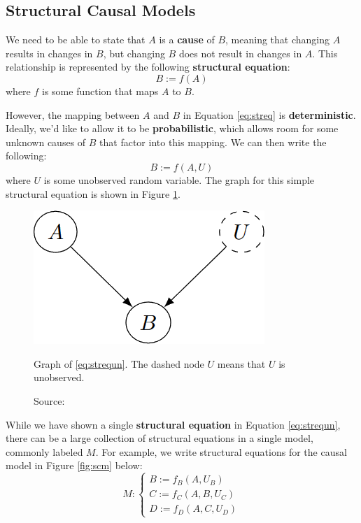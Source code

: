 \subsection{Structural Causal Models}
\label{sec:scm}

We need to be able to state that $A$ is a \textbf{cause} of $B$,
meaning that changing $A$ results in changes in $B$, but changing
$B$ does not result in changes in $A$.
This relationship is represented by the following
\textbf{structural equation}:
\begin{equation}
B := f(A) \label{eq:streq}
\end{equation}
where \( f \) is some function that maps $A$ to $B$.

However, the mapping between $A$ and $B$ in Equation \ref{eq:streq}
is \textbf{deterministic}. Ideally, we'd like to allow it to be
\textbf{probabilistic}, which allows room for some unknown
causes of $B$ that factor into this mapping.
We can then write the following:
\begin{equation}
B := f(A, U) \label{eq:strequn}
\end{equation}
where \( U \) is some unobserved random variable.
The graph for this simple structural equation is shown in Figure \ref{fig:struct_eq}.

\begin{figure}[H]
    \centering
    \includegraphics[width=.25\textwidth]{figures/ch3/23.struct_eq.png}
    \caption{Graph of \ref{eq:strequn}.
    The dashed node $U$ means that
    $U$ is unobserved.}
    \vspace{-10px}
    \caption*{\scriptsize{Source: \cite{Neal_2020a}}}
    \label{fig:struct_eq}
\end{figure}

While we have shown a single \textbf{structural equation}
in Equation \ref{eq:strequn}, there can be a large collection of
structural equations in a single model, commonly
labeled \( M \). For example, we write structural equations
for the causal model in Figure \ref{fig:scm} below:
\begin{equation}
M :
\begin{cases}
B := f_B(A, U_B) \\
C := f_C(A, B, U_C) \\
D := f_D(A, C, U_D)
\end{cases}
\label{eq:scm}
\end{equation}

